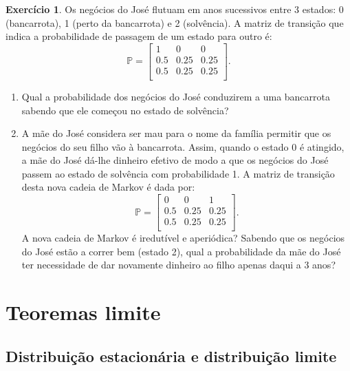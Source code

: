 \documentclass[
  11pt,
  a4paper,
]{book}
\theoremstyle{definition}
\theoremstyle{definition}
\theoremstyle{definition}
\newtheorem{exercise}{Exercício}[chapter]
\theoremstyle{definition}
\theoremstyle{remark}
\begin{document}
\begin{exercise}

Os negócios do José flutuam em anos sucessivos entre 3 estados: 0 (bancarrota), 1 (perto da bancarrota) e 2 (solvência). A matriz de transição que indica a probabilidade de passagem de um estado para outro é:
\[
\mathbb{P} =
\begin{bmatrix}
1 & 0 & 0   \\
0.5 & 0.25 & 0.25  \\
0.5 & 0.25 & 0.25 \\
\end{bmatrix}.
\]

\begin{enumerate}
\def\labelenumi{(\alph{enumi})}
\item
  Qual a probabilidade dos negócios do José conduzirem a uma bancarrota sabendo que ele começou no estado de solvência?
\item
  A mãe do José considera ser mau para o nome da família permitir que os negócios do seu filho vão à bancarrota. Assim, quando o estado 0 é atingido, a mãe do José dá-lhe dinheiro efetivo de modo a que os negócios do José passem ao estado de solvência com probabilidade 1. A matriz de transição desta nova cadeia de Markov é dada por:
  \[
  \mathbb{P} =
  \begin{bmatrix}
  0 & 0 & 1   \\
  0.5 & 0.25 & 0.25  \\
  0.5 & 0.25 & 0.25 \\
  \end{bmatrix}.
  \]
  A nova cadeia de Markov é iredutível e aperiódica? Sabendo que os negócios do José estão a correr bem (estado 2), qual a probabilidade da mãe do José ter necessidade de dar novamente dinheiro ao filho apenas daqui a 3 anos?
\end{enumerate}

\end{exercise}

\section{Teoremas limite}\label{teoremas-limite}

\subsection{Distribuição estacionária e distribuição limite}\label{distribuiuxe7uxe3o-estacionuxe1ria-e-distribuiuxe7uxe3o-limite}
\end{document}
